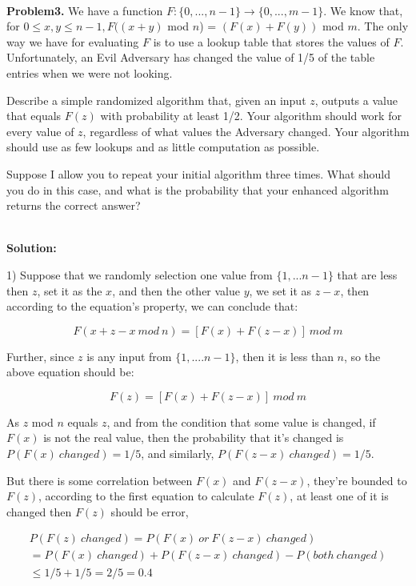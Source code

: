 \documentclass{article}
\begin{document}
~\\

\noindent \textbf{Problem3.} We have a function $F: \{0,...,n-1\} \rightarrow \{0,...,m-1\}$. We know that, for $0 \le x, y \le n - 1, F((x +y)$ mod $n$) = $(F(x) + F(y))$ mod $m$. The only way we have for evaluating $F$ is to use a lookup table that
stores the values of $F$. Unfortunately, an Evil Adversary has changed the value of 1/5 of the table entries
when we were not looking.

Describe a simple randomized algorithm that, given an input $z$, outputs a value that equals $F(z)$ with
probability at least 1/2. Your algorithm should work for every value of $z$, regardless of what values the
Adversary changed. Your algorithm should use as few lookups and as little computation as possible.


Suppose I allow you to repeat your initial algorithm three times. What should you do in this case, and
what is the probability that your enhanced algorithm returns the correct answer?

~\\

\noindent \textbf{Solution:}

1) Suppose that we randomly selection one value from $\{1, ... n-1\}$ that are less then $z$, set it as the $x$, and then the other value $y$, we set it as $z-x$, then according to the equation's property, we can conclude that:

$$F(x + z-x \ mod \ n) = [F(x) + F(z-x)] \ mod \ m$$

Further, since $z$ is any input from $\{1, .... n-1 \}$, then it is less than $n$, so the above equation should be:

$$F(z) = [F(x) + F(z-x)] \ mod \ m$$ 

As $z$ mod $n$ equals $z$, and from the condition that some value is changed, if $F(x)$ is not the real value, then the probability that it's changed is $P(F(x) \ changed) = 1/5$, and similarly, $P(F(z-x) \ changed) = 1/5$.

But there is some correlation between $F(x)$ and $F(z-x)$, they're bounded to $F(z)$, according to the first equation to calculate $F(z)$, at least one of it is changed then $F(z)$ should be error, 


\begin{equation}
\begin{aligned}
P(F(z) \ changed) 
= P(F(x) \ or \ F(z-x) \ changed) \\
= P(F(x) \ changed) 
+ P(F(z-x) \ changed) 
- P(both \ changed) \\
\le 1/5 + 1/5 = 2/5 = 0.4
\end{aligned}
\end{equation}
\end{document}
